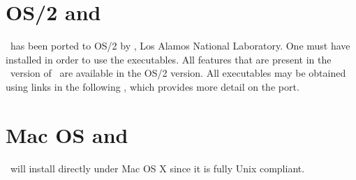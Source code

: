 \section{OS/2 and \gmt}

\GMT\ has been ported to OS/2 by ,
Los Alamos National Laboratory.
One must have 
installed in order to use the executables.  All features 
that are present in the \UNIX\ version of \GMT\ are available in the OS/2 version.
All executables may be obtained using links in the following
,
which provides more detail on the port.

\section{Mac OS and \gmt}

\GMT\ will install directly under Mac OS X since it is fully Unix compliant.

